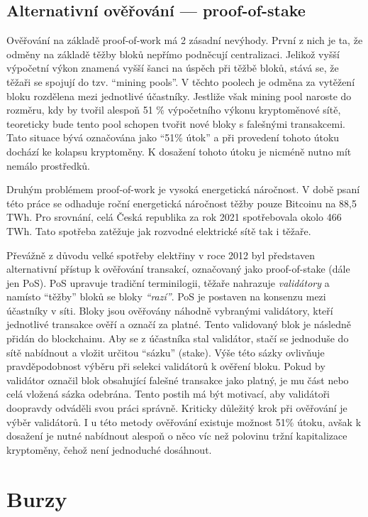 \subsection{Alternativní ověřování --- proof-of-stake}
Ověřování na základě proof-of-work má 2 zásadní nevýhody. První z nich je ta, že odměny na základě těžby bloků nepřímo podněcují centralizaci.
Jelikož vyšší výpočetní výkon znamená vyšší šanci na úspěch při těžbě bloků, stává se, že těžaři se spojují do tzv. \enquote{mining pools}.
V těchto poolech je odměna za vytěžení bloku rozdělena mezi jednotlivé účastníky. Jestliže však mining pool naroste do rozměru, kdy by tvořil
alespoň 51 \% výpočetního výkonu kryptoměnové sítě, teoreticky bude tento pool schopen tvořit nové bloky s falešnými transakcemi. Tato situace
bývá označována jako \enquote{51\% útok} a při provedení tohoto útoku dochází ke kolapsu kryptoměny. K dosažení tohoto útoku je nicméně
nutno mít nemálo prostředků.


Druhým problémem proof-of-work je vysoká energetická náročnost. V době psaní této práce se odhaduje roční energetická náročnost těžby pouze Bitcoinu
na 88,5 TWh. Pro srovnání, celá Česká republika za rok 2021 spotřebovala okolo 466 TWh. Tato spotřeba zatěžuje jak rozvodné elektrické sítě tak i těžaře.

Převážně z důvodu velké spotřeby elektřiny v roce 2012 byl představen alternativní přístup k ověřování transakcí, označovaný jako proof-of-stake (dále jen PoS).
PoS upravuje tradiční terminilogii, těžaře nahrazuje \emph{validátory} a namísto \enquote{těžby} bloků se bloky \emph{\enquote{razí}}. PoS je
postaven na konsenzu mezi účastníky v síti. Bloky jsou ověřovány náhodně vybranými validátory, kteří jednotlivé transakce ověří a označí za platné.
Tento validovaný blok je následně přidán do blockchainu. Aby se z účastníka stal validátor, stačí se jednoduše do sítě nabídnout a vložit určitou
\enquote{sázku} (stake). Výše této sázky ovlivňuje pravděpodobnost výběru při selekci validátorů k ověření bloku. Pokud by validátor označil
blok obsahující falešné transakce jako platný, je mu část nebo celá vložená sázka odebrána. Tento postih má být motivací, aby validátoři doopravdy
odváděli svou práci správně. Kriticky důležitý krok při ověřování je výběr validátorů. I u této metody ověřování existuje možnost 51\% útoku,
avšak k dosažení je nutné nabídnout alespoň o něco víc než polovinu tržní kapitalizace kryptoměny, čehož není jednoduché dosáhnout.


\section{Burzy}
\label{sec:Exchanges}

\endinput